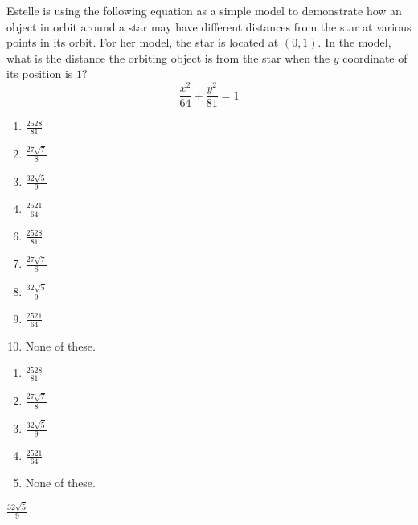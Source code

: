  
Estelle is using the following equation as a simple model to demonstrate how an object in orbit around a star may have different distances from the star at various points in its orbit.  For her model, the star is located at $(0,1)$.  In the model, what is the distance the orbiting object is from the star when the $y$ coordinate of its position is $1$?
$$\frac{x^2}{64}+\frac{y^2}{81}=1$$


\ifsat
	\begin{enumerate}[label=\Alph*)]
		\item $\frac{2528}{81}$
		\item $\frac{27\sqrt{7}}{8}$
		\item $\frac{32\sqrt{5}}{9}$ %
		\item $\frac{2521}{64}$
	\end{enumerate}
\else
\fi

\ifacteven
	\begin{enumerate}[label=\textbf{\Alph*.},itemsep=\fill,align=left]
		\setcounter{enumii}{5}
		\item $\frac{2528}{81}$
		\item $\frac{27\sqrt{7}}{8}$
		\item $\frac{32\sqrt{5}}{9}$ %
		\addtocounter{enumii}{1}
		\item $\frac{2521}{64}$
		\item None of these. 
	\end{enumerate}
\else
\fi

\ifactodd
	\begin{enumerate}[label=\textbf{\Alph*.},itemsep=\fill,align=left]
		\item $\frac{2528}{81}$
		\item $\frac{27\sqrt{7}}{8}$
		\item $\frac{32\sqrt{5}}{9}$ %
		\item $\frac{2521}{64}$
		\item None of these. 
	\end{enumerate}
\else
\fi

\ifgridin
 $\frac{32\sqrt{5}}{9}$ %
		
\else
\fi

